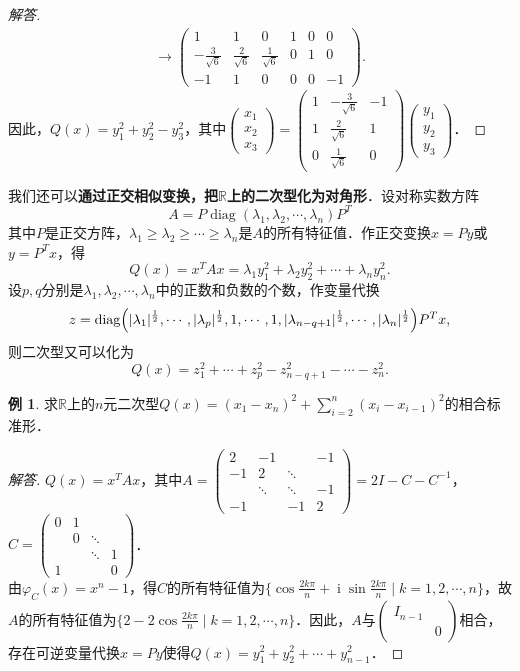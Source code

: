 \documentclass[a4paper,fontset=windows]{ctexbook}
\theoremstyle{definition}
\newtheorem{example}{例}[chapter]
\DeclareMathOperator{\diag}{diag}
\DeclareMathOperator{\I}{i}
\renewcommand{\ge}{\geqslant}
\begin{document}
\begin{proof}[解答]
\begin{gather*}
\to\begin{pmatrix}1&1&0&1&0&0 \\ -\frac{3}{\sqrt{6}}&\frac{2}{\sqrt{6}}&\frac{1}{\sqrt{6}}&0&1&0 \\ -1&1&0&0&0&-1\end{pmatrix}.
\end{gather*}
因此，$Q(x)=y_1^2+y_2^2-y_3^2$，其中$\begin{pmatrix}x_1 \\ x_2 \\ x_3\end{pmatrix}=\begin{pmatrix}1&-\frac{3}{\sqrt{6}}&-1 \\ 1&\frac{2}{\sqrt{6}}&1 \\ 0&\frac{1}{\sqrt{6}}&0\end{pmatrix}\begin{pmatrix}y_1 \\ y_2 \\ y_3\end{pmatrix}$．
\end{proof}

\medskip 我们还可以{\bf 通过正交相似变换，把$\mathbb{R}$上的二次型化为对角形}．设对称实数方阵
$$A=P\diag(\lambda_1,\lambda_2,\cdots,\lambda_n)P^T$$
其中$P$是正交方阵，$\lambda_1\ge\lambda_2\ge\cdots\ge\lambda_n$是$A$的所有特征值．作正交变换$x=Py$或$y=P^Tx$，得
$$Q(x)=x^TAx=\lambda_1y_1^2+\lambda_2y_2^2+\cdots+\lambda_ny_n^2.$$
设$p,q$分别是$\lambda_1,\lambda_2,\cdots,\lambda_n$中的正数和负数的个数，作变量代换
$$z=\diag\Bigl(|\lambda_1|^{\frac12},\cdots,|\lambda_p|^{\frac12},1,\cdots,1,|\lambda_{n-q+1}|^{\frac12},\cdots,|\lambda_n|^{\frac12}\Bigr)P^Tx,$$
则二次型又可以化为
$$Q(x)=z_1^2+\cdots+z_p^2-z_{n-q+1}^2-\cdots-z_n^2.$$

\begin{example}
求$\mathbb{R}$上的$n$元二次型$Q(x)=(x_1-x_n)^2+\sum\limits_{i=2}^n(x_i-x_{i-1})^2$的相合标准形．
\end{example}

\begin{proof}[解答]
$Q(x)=x^TAx$，其中$A=\begin{pmatrix}2&-1&&-1 \\ -1&2&\ddots& \\ &\ddots&\ddots&-1 \\ -1&&-1&2\end{pmatrix}=2I-C-C^{-1}$，$C=\begin{pmatrix}0&1&& \\ &0&\ddots& \\ &&\ddots&1 \\ 1&&&0\end{pmatrix}$．\\
由$\varphi_C(x)=x^n-1$，得$C$的所有特征值为$\{\cos\frac{2k\pi}{n}+\I\sin\frac{2k\pi}{n}\mid k=1,2,\cdots,n\}$，故$A$的所有特征值为$\{2-2\cos\frac{2k\pi}{n}\mid k=1,2,\cdots,n\}$．因此，$A$与$\begin{pmatrix}I_{n-1}& \\ &0\end{pmatrix}$相合，存在可逆变量代换$x=Py$使得$Q(x)=y_1^2+y_2^2+\cdots+y_{n-1}^2$．
\end{proof}
\end{document}

